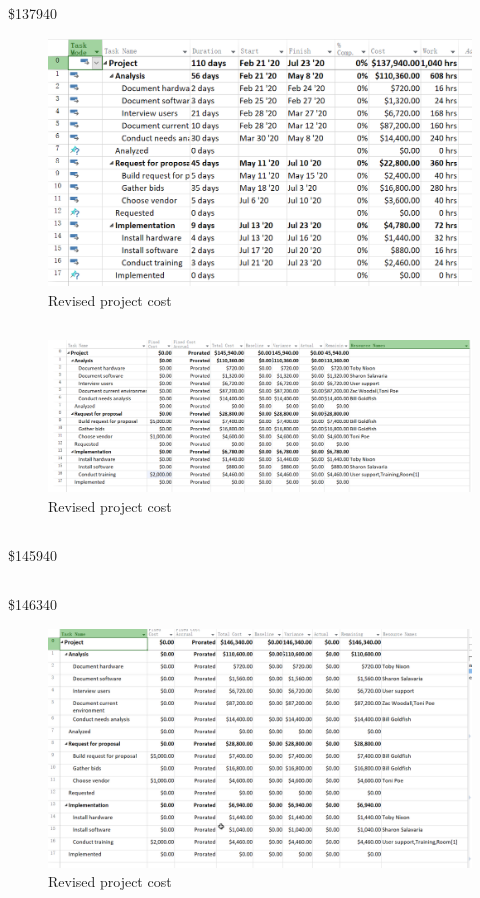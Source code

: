 \documentclass[runningheads]{llncs}
\begin{document}
\subsection{}
\$137940
\begin{figure}[H]
    \centering
    \includegraphics[width=1.0\textwidth]{./image/f2}
    \caption{Revised project cost}
\end{figure}
\subsection{}
\begin{figure}[H]
    \centering
    \includegraphics[width=1.0\textwidth]{./image/f3}
    \caption{Revised project cost}
\end{figure}
\subsection{}
\$145940
\subsection{}
\$146340
\begin{figure}[H]
    \centering
    \includegraphics[width=1.0\textwidth]{./image/f4}
    \caption{Revised project cost}
\end{figure}
\end{document}
